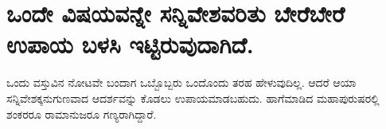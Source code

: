 \section*{ಒಂದೇ ವಿಷಯವನ್ನೇ ಸನ್ನಿವೇಶವರಿತು ಬೇರೆಬೇರೆ ಉಪಾಯ ಬಳಸಿ ಇಟ್ಟಿರುವುದಾಗಿದೆ.}

ಒಂದು ವಸ್ತುವಿನ ನೋಟವೇ ಬಂದಾಗ ಒಬ್ಬೊಬ್ಬರು ಒಂದೊಂದು ತರಹ ಹೇಳುವುದಿಲ್ಲ. ಆದರೆ ಆಯಾ ಸನ್ನಿವೇಶಕ್ಕನುಗುಣವಾದ ಆದರ್ಶವನ್ನು ಕೊಡಲು ಉಪಾಯಮಾಡಬಹುದು. ಹಾಗೆಮಾಡಿದ ಮಹಾಪುರುಷರಲ್ಲಿ ಶಂಕರರೂ ರಾಮಾನುಜರೂ ಗಣ್ಯರಾಗಿದ್ದಾರೆ.



\begin{shloka}

\end{shloka}
\begin{shloka}

\end{shloka}
\begin{shloka}

\end{shloka}
\begin{shloka}

\end{shloka}
\begin{shloka}

\end{shloka}


\section*{}
\section*{}
\section*{}
\section*{}
\section*{}
\section*{}

